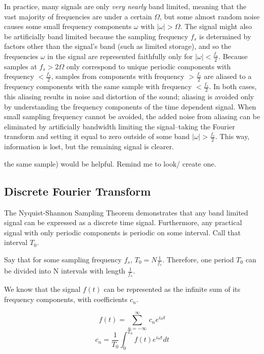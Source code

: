 \documentclass[12pt]{article}
\begin{document}
In practice, many signals are only \emph{very nearly} band limited, meaning 
that the vast majority of frequencies are under a certain \( \Omega \), but 
some almost random noise causes some small frequency components \( \omega \) 
with \( |\omega| > \Omega \). The signal might also be artificially band 
limited because the sampling frequency \( f_s\) is determined by factors other 
than the signal's band (such as limited storage), and so the frequencies \( 
\omega \) in the signal are represented faithfully only for \(|\omega| < 
\frac{f_s}{2} \). Because samples at \( f_s > 2\Omega \) only correspond to 
unique periodic components with frequency \( < \frac{f_s}{2} \), samples from 
components with frequency \( > \frac{f_s}{2} \) are aliased to a frequency 
components with the same sample with frequency \( < \frac{f_s}{2} \). In both 
cases, this aliasing results in noise and distortion of the sound; aliasing is 
avoided only by understanding the frequency components of the time dependent 
signal. When small sampling frequency cannot be avoided, the added noise from 
aliasing can be eliminated by artificially bandwidth limiting the 
signal--taking the Fourier transform and setting it equal to zero outside of 
some band \( |\omega| > \frac{f_s}{2}  \). This way, information is lost, but 
the remaining signal is clearer. 

the same sample) would be helpful. Remind me to look/ create one.

\subsection{Discrete Fourier Transform}

The Nyquist-Shannon Sampling Theorem demonstrates that any band limited signal 
can be expressed as a discrete time signal. Furthermore, any practical signal 
with only periodic components is periodic on some interval. Call that interval 
\( T_0\). 

Say that for some sampling frequency \(f_s\), \(T_0 = N\frac{1}{f_{s}} \). 
Therefore, one period \( T_0\) can be divided into N intervals with length \( 
\frac{1}{f_{s}}\).

We know that the signal \(f(t)\) can be represented as the infinite sum of its 
frequency components, with coefficients \(c_n\).

\[ f(t) = \sum_{n = -\infty}^{\infty} \,c_n e^{i\omega t} \]
\[ c_{n} = \frac{1}{T_0} \int_{0}^{T_0} f(t) e^{i\omega t} dt\]
\end{document}
